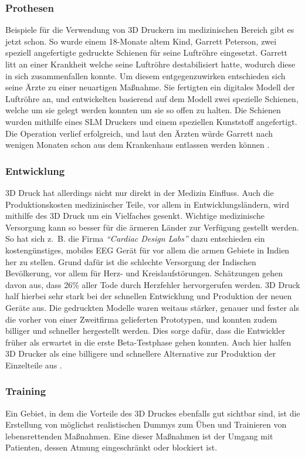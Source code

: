 \subsubsection{Prothesen}
Beispiele für die Verwendung von 3D Druckern im medizinischen Bereich gibt es jetzt schon. So wurde einem 18-Monate altem Kind, Garrett Peterson, zwei speziell angefertigte gedruckte Schienen für seine Luftröhre eingesetzt. Garrett litt an einer Krankheit welche seine Luftröhre destabilisiert hatte, wodurch diese in sich zusammenfallen konnte. Um diesem entgegenzuwirken entschieden sich seine Ärzte zu einer neuartigen Maßnahme. Sie fertigten ein digitales Modell der Luftröhre an, und entwickelten basierend auf dem Modell zwei spezielle Schienen, welche um sie gelegt werden konnten um sie so offen zu halten. Die Schienen wurden mithilfe eines SLM Druckers und einem speziellen Kunststoff angefertigt. Die Operation verlief erfolgreich, und laut den Ärzten würde Garrett nach wenigen Monaten schon aus dem Krankenhaus entlassen werden können \parencite{BABY}.

\subsubsection{Entwicklung}
3D Druck hat allerdings nicht nur direkt in der Medizin Einfluss. Auch die Produktionskosten medizinischer Teile, vor allem in Entwicklungsländern, wird mithilfe des 3D Druck um ein Vielfaches gesenkt. Wichtige medizinische Versorgung kann so besser für die ärmeren Länder zur Verfügung gestellt werden. So hat sich z.~B. die Firma \emph{\textquotedblleft Cardiac Design Labs\textquotedblright} dazu entschieden ein kostengünstiges, mobiles EEG Gerät für vor allem die armen Gebiete in Indien her zu stellen. Grund dafür ist die schlechte Versorgung der Indischen Bevölkerung, vor allem für Herz- und Kreislaufstörungen. Schätzungen gehen davon aus, dass 26\% aller Tode durch Herzfehler hervorgerufen werden. 3D Druck half hierbei sehr stark bei der schnellen Entwicklung und Produktion der neuen Geräte aus. Die gedruckten Modelle waren weitaus stärker, genauer und fester als die vorher von einer Zweitfirma gelieferten Prototypen, und konnten zudem billiger und schneller hergestellt werden. Dies sorge dafür, dass die Entwickler früher als erwartet in die erste Beta-Testphase gehen konnten. Auch hier halfen 3D Drucker als eine billigere und schnellere Alternative zur Produktion der Einzelteile aus \parencite{MIRCAM_STUDY}.

\subsubsection{Training}
Ein Gebiet, in dem die Vorteile des 3D Druckes ebenfalls gut sichtbar sind, ist die Erstellung von möglichst realistischen Dummys zum Üben und Trainieren von lebensrettenden Maßnahmen. Eine dieser Maßnahmen ist der Umgang mit Patienten, dessen Atmung eingeschränkt oder blockiert ist. 

